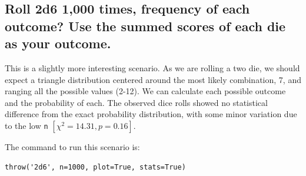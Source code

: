 \documentclass{article}
\begin{document}


\subsection{Roll 2d6 1,000 times, frequency of each outcome? Use the summed scores of each die as your outcome.}
This is a slightly more interesting scenario. As we are rolling a two die, we should expect a triangle distribution centered around the most likely combination, 7, and ranging all the possible values (2-12). We can calculate each possible outcome and the probability of each. The observed dice rolls showed no statistical difference from the exact probability distribution, with some minor variation due to the low \texttt{n} $[\chi^2=14.31, p=0.16]$.

The command to run this scenario is:

\begin{lstlisting}
throw('2d6', n=1000, plot=True, stats=True)
\end{lstlisting}
\end{document}
